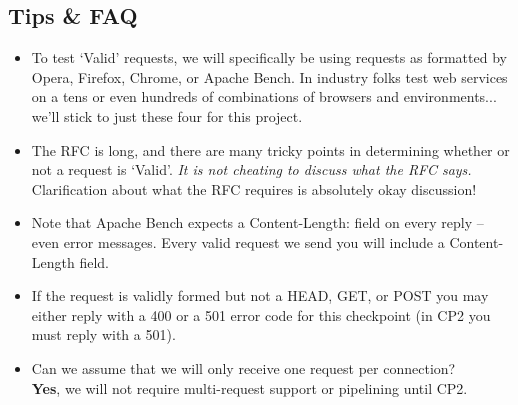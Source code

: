 \subsection{Tips \& FAQ}
    \begin{itemize}
      \item To test `Valid' requests, we will specifically be using requests as formatted by Opera, Firefox, Chrome, or Apache Bench. In industry folks test web services on a tens or even hundreds of combinations of browsers and environments... we'll stick to just these four for this project.
    
      \item The RFC is long, and there are many tricky points in determining whether or not a request is `Valid'. {\it It is not cheating to discuss what the RFC says.} Clarification about what the RFC requires is absolutely okay discussion!  

      \item Note that Apache Bench expects a Content-Length: field on every reply -- even error messages. Every valid request we send you will include a Content-Length field.

      \item If the request is validly formed but not a HEAD, GET, or POST you may either reply with a 400 or a 501 error code for this checkpoint (in CP2 you must reply with a 501).
  
      \item Can we assume that we will only receive one request per connection?\\
        {\bf Yes}, we will not require multi-request support or pipelining until CP2.
    \end{itemize}

\newpage
